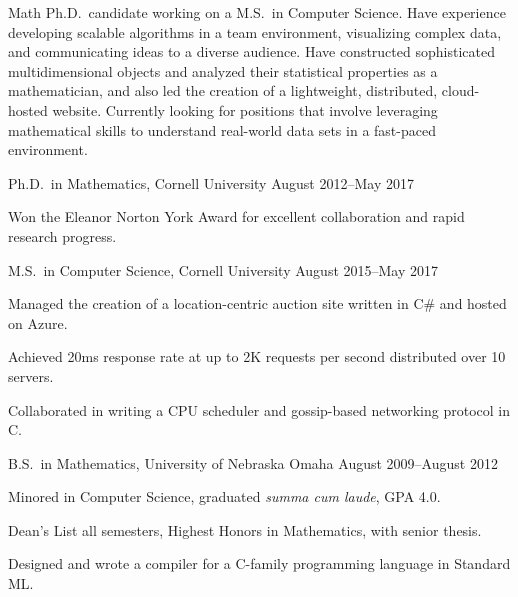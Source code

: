 \documentclass[11pt, letterpaper]{awesome-cv}
\begin{document}
\makecvheader






\begin{cvparagraph}
Math Ph.D.~candidate working on a M.S.~in Computer Science. 
Have experience developing scalable algorithms in a team environment, visualizing complex data, and communicating ideas to a diverse audience.
Have constructed sophisticated multidimensional objects and analyzed their statistical properties as a mathematician, and also led the creation of a lightweight, distributed, cloud-hosted website. 
Currently looking for positions that involve leveraging mathematical skills to understand real-world data sets in a fast-paced environment. 
\end{cvparagraph}






\begin{cventries}

\cventry
	{Ph.D.~in Mathematics, Cornell University}
	{}{}
	{August 2012--May 2017}
	{
		\begin{cvitems}
			\item{Won the Eleanor Norton York Award for excellent collaboration and rapid research progress.}
		\end{cvitems}
	}
	
\cventry
	{M.S.~in Computer Science, Cornell University}
	{}{}
	{August 2015--May 2017}
	{
		\begin{cvitems}
			\item{Managed the creation of a location-centric auction site written in C\# and hosted on Azure.}
			\item{Achieved 20ms response rate at up to 2K requests per second distributed over 10 servers.}
			\item{Collaborated in writing a CPU scheduler and gossip-based networking protocol in C.}
		\end{cvitems}
	}
	
\cventry
	{B.S.~in Mathematics, University of Nebraska Omaha}
	{}{}
	{August 2009--August 2012}
	{
		\begin{cvitems}
			\item{Minored in Computer Science, graduated \emph{summa cum laude}, GPA 4.0.}
			\item{Dean's List all semesters, Highest Honors in Mathematics, with senior thesis.}
			\item{Designed and wrote a compiler for a C-family programming language in Standard ML.}
		\end{cvitems}
	}
	
\end{cventries}
\end{document}
